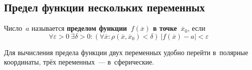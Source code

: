 \subsection{Предел функции нескольких переменных}
Число~$a$ называется \textbf{пределом функции~$f(\overline x)$ в точке~$\overline x_0$}, если
\begin{equation*}
\forall \varepsilon > 0 \ \exists \delta > 0 \colon (\forall \overline x \colon \rho(\overline x, \overline x_0) < \delta) \ |f(\overline x) - a| < \varepsilon
\end{equation*}

Для вычисления предела функции двух переменных удобно перейти в~полярные координаты, трёх переменных~--- в~сферические.